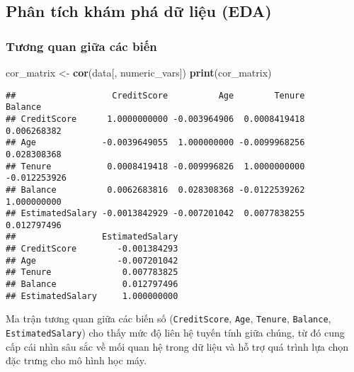\documentclass[
]{article}
\newenvironment{Shaded}{\begin{snugshade}}{\end{snugshade}}
\newcommand{\FunctionTok}[1]{\textcolor[rgb]{0.13,0.29,0.53}{\textbf{#1}}}
\newcommand{\NormalTok}[1]{#1}
\newcommand{\OtherTok}[1]{\textcolor[rgb]{0.56,0.35,0.01}{#1}}
\begin{document}
\subsection{Phân tích khám phá dữ liệu (EDA)}\label{sec-eda}

\subsubsection{Tương quan giữa các biến}\label{sec-correlation}

\begin{Shaded}
\begin{Highlighting}[]
\NormalTok{cor\_matrix }\OtherTok{\textless{}{-}} \FunctionTok{cor}\NormalTok{(data[, numeric\_vars])}
\FunctionTok{print}\NormalTok{(cor\_matrix)}
\end{Highlighting}
\end{Shaded}

\begin{verbatim}
##                   CreditScore          Age        Tenure      Balance
## CreditScore      1.0000000000 -0.003964906  0.0008419418  0.006268382
## Age             -0.0039649055  1.000000000 -0.0099968256  0.028308368
## Tenure           0.0008419418 -0.009996826  1.0000000000 -0.012253926
## Balance          0.0062683816  0.028308368 -0.0122539262  1.000000000
## EstimatedSalary -0.0013842929 -0.007201042  0.0077838255  0.012797496
##                 EstimatedSalary
## CreditScore        -0.001384293
## Age                -0.007201042
## Tenure              0.007783825
## Balance             0.012797496
## EstimatedSalary     1.000000000
\end{verbatim}

Ma trận tương quan giữa các biến số (\texttt{CreditScore}, \texttt{Age},
\texttt{Tenure}, \texttt{Balance}, \texttt{EstimatedSalary}) cho thấy
mức độ liên hệ tuyến tính giữa chúng, từ đó cung cấp cái nhìn sâu sắc về
mối quan hệ trong dữ liệu và hỗ trợ quá trình lựa chọn đặc trưng cho mô
hình học máy.
\end{document}
